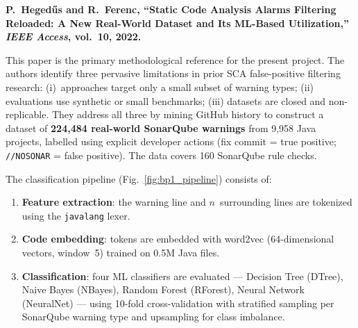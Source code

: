 \documentclass[conference]{IEEEtran}
\begin{document}
\textbf{P.\ Heged\H{u}s and R.\ Ferenc, ``Static Code Analysis Alarms
Filtering Reloaded: A New Real-World Dataset and Its ML-Based
Utilization,'' \textit{IEEE Access}, vol.~10, 2022.}
\cite{hegedus2022sca}

This paper is the primary methodological reference for the present project.
The authors identify three pervasive limitations in prior SCA false-positive
filtering research: (i)~approaches target only a small subset of warning types; (ii)
evaluations use synthetic or small benchmarks; (iii) datasets are closed and
non-replicable. They address all three by mining GitHub history to construct
a dataset of \textbf{224,484 real-world SonarQube warnings} from 9,958 Java
projects, labelled using explicit developer actions (fix commit = true positive;
\texttt{//NOSONAR} = false positive). The data covers 160 SonarQube rule checks.

The classification pipeline (Fig.~\ref{fig:bp1_pipeline}) consists of:
\begin{enumerate}[leftmargin=*, label=\arabic*.]
  \item \textbf{Feature extraction}: the warning line and $n$~surrounding lines
        are tokenized using the \texttt{javalang} lexer.
  \item \textbf{Code embedding}: tokens are embedded with
        word2vec (64-dimensional vectors, window~5) trained on 0.5M Java files.
  \item \textbf{Classification}: four ML classifiers are evaluated ---
        Decision Tree (DTree), Naive Bayes (NBayes), Random Forest (RForest),
        Neural Network (NeuralNet) --- using 10-fold cross-validation with
        stratified sampling per SonarQube warning type and upsampling for
        class imbalance.
\end{enumerate}
\end{document}
